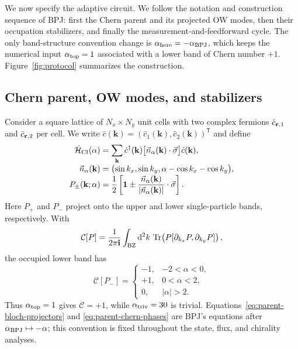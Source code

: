 \documentclass[aps,prx,twocolumn,superscriptaddress,longbibliography,nofootinbib,floatfix]{revtex4-2}
\newcommand{\ii}{\boldsymbol{\mathrm{i}}}
\newcommand{\mc}[1]{\mathcal{#1}}
\newcommand{\mbf}[1]{\mathbf{#1}}
\newcommand{\h}[1]{\hat{#1}}
\newcommand{\Id}{\mathbf{1}}
\newcommand{\bfr}{{\bf r}}
\newcommand{\dd}{\mathrm{d}}
\begin{document}
We now specify the adaptive circuit.  We follow the notation and construction sequence of BPJ: first the Chern parent and its projected OW modes, then their occupation stabilizers, and finally the measurement-and-feedforward cycle.  The only band-structure convention change is
\(\alpha_{\rm here}=-\alpha_{\rm BPJ}\), which keeps the numerical input
\(\alpha_{\rm top}=1\) associated with a lower band of Chern number \(+1\).
Figure~\ref{fig:protocol} summarizes the construction.

\subsection{Chern parent, OW modes, and stabilizers}

Consider a square lattice of \(N_x\times N_y\) unit cells with two complex
fermions \(\h c_{\bfr,1}\) and \(\h c_{\bfr,2}\) per cell.  We write
\(\h c(\mbf k)=(\h c_1(\mbf k),\h c_2(\mbf k))^{\mathsf T}\) and define
\begin{align}
 \h{\mc H}_{\rm CI}(\alpha)
 &=\sum_{\mbf k}\h c^\dagger(\mbf k)
 \bigl[\vec n_\alpha(\mbf k)\cdot\vec\sigma\bigr]\h c(\mbf k),
 \nonumber\\[-1mm]
 \vec n_\alpha(\mbf k)
 &=\bigl(\sin k_x,\sin k_y,
 \alpha-\cos k_x-\cos k_y\bigr),
 \nonumber\\[-1mm]
 P_\pm(\mbf k;\alpha)
 &=\frac{1}{2}\left[
 \Id\pm\frac{\vec n_\alpha(\mbf k)}
 {|\vec n_\alpha(\mbf k)|}\cdot\vec\sigma\right].
 \label{eq:parent-bloch-projectors}
\end{align}
Here \(P_+\) and \(P_-\) project onto the upper and lower single-particle
bands, respectively.  With
\begin{equation}
 \mathcal C[P]=\frac{1}{2\pi\ii}\int_{\rm BZ}\dd^2k\,
 \Tr\!\left(P[\partial_{k_x}P,\partial_{k_y}P]\right),
 \label{eq:parent-chern-number}
\end{equation}
the occupied lower band has
\begin{equation}
 \mathcal C[P_-]=
 \begin{cases}
  -1,&-2<\alpha<0,\\
  +1,&0<\alpha<2,\\
  0,&|\alpha|>2.
 \end{cases}
 \label{eq:parent-chern-phases}
\end{equation}
Thus \(\alpha_{\rm top}=1\) gives \(\mathcal C=+1\), while
\(\alpha_{\rm triv}=30\) is trivial.  Equations~\eqref{eq:parent-bloch-projectors}
and \eqref{eq:parent-chern-phases} are BPJ's equations after
\(\alpha_{\rm BPJ}\mapsto-\alpha\); this convention is fixed throughout the
state, flux, and chirality analyses.
\end{document}
